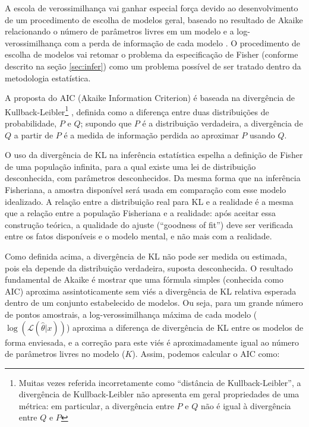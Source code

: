 A escola de verossimilhança vai ganhar especial força devido ao desenvolvimento de um procedimento de escolha de
modelos geral, baseado no resultado de Akaike relacionando o número de parâmetros livres em um modelo e a
log-verossimilhança com a perda de informação de cada modelo \citep{Akaike74}. O procedimento de escolha de modelos
vai retomar o problema da especificação de Fisher (conforme descrito na seção \ref{sec:infer}) como um problema
possível de ser tratado dentro da metodologia estatística. 

A proposta do AIC (Akaike Information Criterion)
é baseada na divergência de Kullback-Leibler\footnote{Muitas vezes referida incorretamente
como ``distância de Kullback-Leibler'', a divergência de Kullback-Leibler não apresenta em geral propriedades
de uma métrica: em particular, a divergência entre $P$ e $Q$ não é igual à divergência entre $Q$ e $P$} 
\citep{Kullback51}, definida
como a diferença entre duas distribuições de probabilidade, $P$ e $Q$; supondo que $P$ é a distribuição verdadeira,
a divergência de $Q$ a partir de $P$ é a medida de informação perdida ao aproximar $P$ usando $Q$.

O uso da divergência de KL na inferência estatística espelha a definição de Fisher de uma população infinita, 
para a qual existe uma lei de distribuição desconhecida, com parâmetros desconhecidos. Da mesma forma que
na inferência Fisheriana, a amostra disponível será usada em comparação com esse modelo idealizado. A relação entre
a distribuição real para KL e a realidade é a mesma que a relação entre a população Fisheriana e a realidade: 
após aceitar essa construção teórica, a qualidade do ajuste (``goodness of fit'') deve ser verificada entre
os fatos disponíveis e o modelo mental, e não mais com a realidade. 

Como definida acima, a divergência de KL não pode ser medida ou estimada, pois ela depende da distribuição
verdadeira, suposta desconhecida. O resultado fundamental de Akaike é mostrar que uma fórmula simples
(conhecida como AIC)
aproxima assintoticamente sem viés a divergência de KL relativa esperada dentro de um conjunto estabelecido
de modelos. Ou seja, para um grande número de pontos amostrais, a log-verossimilhança máxima de cada modelo
($\log(\mathcal{L}(\hat\theta|x))$)
aproxima a diferença de divergência de KL entre os modelos de forma enviesada, e a correção para este viés
é aproximadamente igual ao número de parâmetros livres no modelo ($K$)\citep{Burnham04}. 
Assim, podemos calcular o AIC como:

